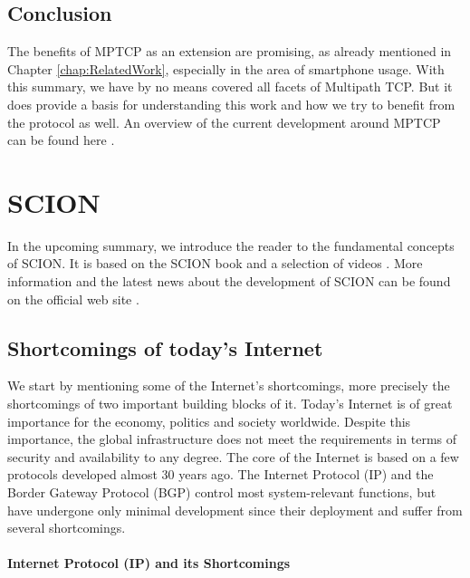 \subsection*{Conclusion}

The benefits of MPTCP as an extension are promising, as already mentioned in Chapter \ref{chap:RelatedWork}, especially in the area of smartphone usage.  With this summary, we have by no means covered all facets of Multipath TCP. But it does provide a basis for understanding this work and how we try to benefit from the protocol as well. An overview of the current development around MPTCP can be found here \cite{MPTCPWebMain}.

\section{SCION}
\label{sec:SCION}

In the upcoming summary, we introduce the reader to the fundamental concepts of SCION. It is based on the SCION book \cite{SCIONBook} and a selection of videos \cite{SCIONWebVideos}. More information and the latest news about the development of SCION can be found on the official web site \cite{SCIONWebMain}.

\subsection*{Shortcomings of today's Internet}

We start by mentioning some of the Internet's shortcomings, more precisely the shortcomings of two important building blocks of it. Today's Internet is of great importance for the economy, politics and society worldwide. Despite this importance, the global infrastructure does not meet the requirements in terms of security and availability to any degree. The core of the Internet is based on a few protocols developed almost 30 years ago. The Internet Protocol (IP) and the Border Gateway Protocol (BGP) control most system-relevant functions, but have undergone only minimal development since their deployment and suffer from several shortcomings.

\paragraph{Internet Protocol (IP) and its Shortcomings}

